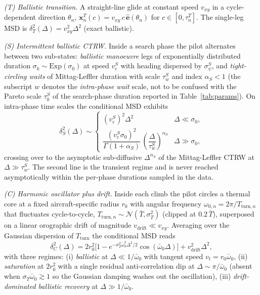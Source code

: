 \documentclass[10pt,twocolumn,a4paper]{article}
\begin{document}
\emph{(T) Ballistic transition.} A straight-line glide at constant
speed $v_{xy}$ in a cycle-dependent direction $\theta_n$,
$\mathbf{x}^T_n(c)=v_{xy}\,c\,\hat{\mathbf{e}}(\theta_n)$ for
$c\in[0,\tau^T_n]$. The single-leg MSD is
$\delta^2_T(\Delta)=v_{xy}^2\Delta^2$ (exact ballistic).

\emph{(S) Intermittent ballistic CTRW.} Inside a search phase the
pilot alternates between two sub-states: \emph{ballistic
manoeuvre} legs of exponentially distributed duration
$\sigma_k\sim\mathrm{Exp}(\sigma_0)$ at speed $v_c^S$ with heading
dispersed by $\sigma_\psi^S$, and \emph{tight-circling waits} of
Mittag-Leffler duration with scale $\tau_w^S$ and index
$\alpha_S<1$ (the subscript $w$ denotes the
\emph{intra-phase wait} scale, not to be confused with the Pareto
scale $\tau_0^S$ of the search-phase duration reported in
Table~\ref{tab:params}). On intra-phase time scales the
conditional MSD exhibits
\begin{equation}
\delta^2_S(\Delta)\sim\begin{cases}
(v_c^S)^2\Delta^2 & \Delta\ll\sigma_0,\\[2pt]
\dfrac{(v_c^S\sigma_0)^2}{\Gamma(1+\alpha_S)}\,
\left(\dfrac{\Delta}{\tau_w^S}\right)^{\alpha_S} & \Delta\gg\sigma_0,
\end{cases}
\label{eq:msd-search}
\end{equation}
crossing over to the asymptotic sub-diffusive $\Delta^{\alpha_S}$
of the Mittag-Leffler CTRW at $\Delta\gg\tau_w^S$. The second line
is the transient regime and is never reached asymptotically within
the per-phase durations sampled in the data.

\emph{(C) Harmonic oscillator plus drift.} Inside each climb the
pilot circles a thermal core at a fixed aircraft-specific radius
$r_0$ with angular frequency $\omega_{0,n}=2\pi/T_{\mathrm{turn},n}$
that fluctuates cycle-to-cycle,
$T_{\mathrm{turn},n}\sim\mathcal{N}(\bar{T},\sigma_T^2)$ (clipped
at $0.2\,\bar{T}$), superposed on a linear orographic drift of
magnitude $v_{\mathrm{drift}}\ll v_{xy}$. Averaging over the
Gaussian dispersion of $T_{\mathrm{turn}}$ the conditional MSD
reads
\begin{equation}
\delta^2_C(\Delta)=2r_0^2\bigl[
1-e^{-\sigma_T^2\bar{\omega}_0^2\Delta^2/2}\cos(\bar{\omega}_0\Delta)
\bigr]+v_{\mathrm{drift}}^2\Delta^2,
\label{eq:msd-climb}
\end{equation}
with three regimes: (i) \emph{ballistic} at
$\Delta\ll 1/\bar{\omega}_0$ with tangent speed
$v_t=r_0\bar{\omega}_0$, (ii) \emph{saturation} at $2r_0^2$ with a
single residual anti-correlation dip at
$\Delta\sim\pi/\bar{\omega}_0$ (absent when
$\sigma_T\bar{\omega}_0\gtrsim 1$ so the Gaussian damping washes
out the oscillation), (iii) \emph{drift-dominated ballistic
recovery} at $\Delta\gg 1/\bar{\omega}_0$.
\end{document}
